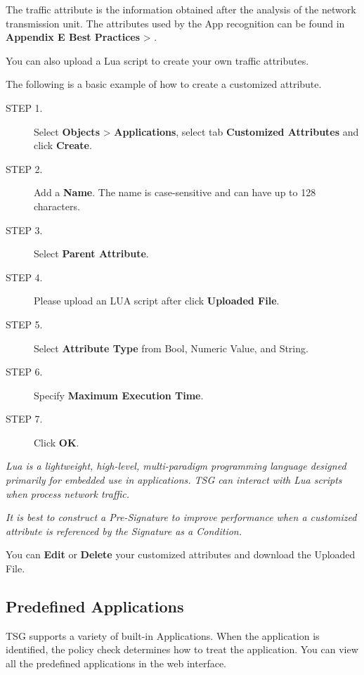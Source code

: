 The traffic attribute is the information obtained after the analysis of the network transmission unit. The attributes used by the App recognition can be found in \textbf{Appendix E Best Practices} > \textbf{\hyperlink{link:Custom Application}{\color{linkblue}{Custom Application}}}.


You can also upload a Lua script to create your own traffic attributes.


The following is a basic example of how to create a customized attribute.

\begin{description}
    \item[STEP 1.]	Select \textbf{Objects} > \textbf{Applications}, select tab \textbf{Customized Attributes} and click \textbf{Create}.
    \item[STEP 2.]	Add a \textbf{Name}. The name is case-sensitive and can have up to 128 characters.
    \item[STEP 3.]	Select \textbf{Parent Attribute}.
    \item[STEP 4.]	Please upload an LUA script after click \textbf{Uploaded File}.
    \item[STEP 5.]	Select \textbf{Attribute Type} from Bool, Numeric Value, and String.
    \item[STEP 6.]	Specify \textbf{Maximum Execution Time}.
    \item[STEP 7.]	Click \textbf{OK}.
\end{description}

\notemark\textit{Lua is a lightweight, high-level, multi-paradigm programming language designed primarily for embedded use in applications. 
TSG can interact with Lua scripts when process network traffic.}	


\notemark\textit{It is best to construct a Pre-Signature to improve performance when a customized attribute is referenced by the Signature as a Condition.} 


You can \textbf{Edit} or \textbf{Delete} your customized attributes and download the Uploaded File.

\subsection*{\hypertarget{link:Predefined Applications}{Predefined Applications}}
\label{sec:objects:application:predefined}

TSG supports a variety of built-in Applications. When the application is identified, the policy check determines how to treat the application. You can view all the predefined applications in the web interface.


